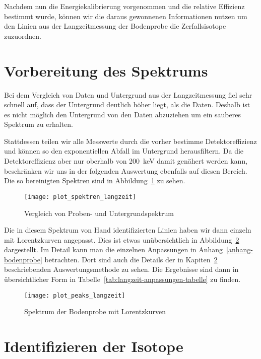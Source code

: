 \documentclass[11pt, ngerman, fleqn, DIV=15, headinclude, BCOR=2cm]{scrreprt}
\newcommand{\plotwidth}{0.8\linewidth}
\begin{document}
Nachdem nun die Energiekalibrierung vorgenommen und die relative
Effizienz bestimmt wurde, können wir die daraus gewonnenen Informationen nutzen
um den Linien aus der Langzeitmessung der Bodenprobe die Zerfallsisotope
zuzuordnen.

\section{Vorbereitung des Spektrums}

Bei dem Vergleich von Daten und Untergrund aus der Langzeitmessung fiel sehr
schnell auf, dass der Untergrund deutlich höher liegt, als die Daten. Deshalb
ist es nicht möglich den Untergrund von den Daten abzuziehen um ein sauberes
Spektrum zu erhalten.

Stattdessen teilen wir alle Messwerte durch die vorher bestimme
Detektoreffizienz und können so den exponentiellen Abfall im Untergrund
herausfiltern. Da die Detektoreffizienz aber nur oberhalb von
\SI{200}{\kilo\electronvolt} damit genähert werden kann, beschränken wir uns in
der folgenden Auswertung ebenfalls auf diesen Bereich. Die so bereinigten
Spektren sind in Abbildung~\ref{fig:langzeit_probe_untergrund} zu sehen.

\begin{figure}
	\centering
	\texttt{[image: plot\_spektren\_langzeit]}
	\caption{%
		Vergleich von Proben- und Untergrundspektrum
	}
	\label{fig:langzeit_probe_untergrund}
\end{figure}

Die in diesem Spektrum von Hand identifizierten Linien haben wir dann einzeln
mit Lorentzkurven angepasst. Dies ist etwas unübersichtlich in
Abbildung~\ref{fig:langzeit_probe_peaks} dargestellt. Im Detail kann man die
einzelnen Anpassungen in Anhang~\ref{anhang-bodenprobe} betrachten. Dort sind
auch die Details der in Kapiten~\ref{identifizieren-isotope} beschriebenden
Auswertungsmethode zu sehen.
Die Ergebnisse sind dann in übersichtlicher Form in
Tabelle~\ref{tab:langzeit-anpassungen-tabelle} zu finden.

\begin{figure}
	\centering
	\texttt{[image: plot\_peaks\_langzeit]}
	\caption{%
		Spektrum der Bodenprobe mit Lorentzkurven
	}
	\label{fig:langzeit_probe_peaks}
\end{figure}

\section{Identifizieren der Isotope}\label{identifizieren-isotope}
\end{document}

